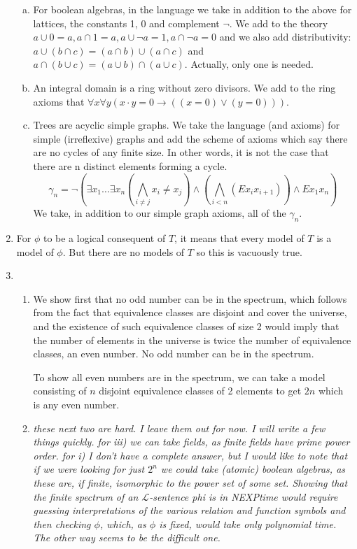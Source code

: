 \documentclass[10pt]{article}
\newcommand{\A}{\forall}
\newcommand{\E}{\exists}
\begin{document}
\begin{enumerate}[1.]
\begin{enumerate}[a)]
	\item For boolean algebras, in the language we take in addition to the above for lattices, the constants 1, 0 and complement $\neg$. We add to the theory $a \cup 0 = a, a \cap 1 = a, a \cup \neg a = 1, a \cap \neg a = 0$ and we also add distributivity: $a \cup (b \cap c) = (a \cap b) \cup (a \cap c)$ and $a \cap (b \cup c) = (a \cup b) \cap (a \cup c)$. Actually, only one is needed. 
	
	\item An integral domain is a ring without zero divisors. We add to the ring axioms that $\A x \A y (x \cdot y = 0 \to ((x = 0) \lor (y = 0)))$. 
	
	\item Trees are acyclic simple graphs. We take the language (and axioms) for simple (irreflexive) graphs and add the scheme of axioms which say there are no cycles of any finite size. In other words, it is not the case that there are n distinct elements forming a cycle. \[\gamma_n = \neg (\E x_1 \ldots \E x_n (\bigwedge_{i \neq j} x_i \neq x_j)  \land (\bigwedge_{i < n} (Ex_ix_{i+1})) \land Ex_1x_n)\] We take, in addition to our simple graph axioms, all of the $\gamma_n$. 
	
	\end{enumerate}

\item For $\phi$ to be a logical consequent of $T$, it means that every model of $T$ is a model of $\phi$. But there are no models of $T$ so this is vacuously true. 

\item 

	 \begin{enumerate} 
	 
	  \item We show first that no odd number can be in the spectrum, which follows from the fact that equivalence classes are disjoint and cover the universe, and the existence of such equivalence classes of size 2 would imply that the number of elements in the universe is twice the number of equivalence classes, an even number. No odd number can be in the spectrum. 
	
	To show all even numbers are in the spectrum, we can take a model consisting of $n$ disjoint equivalence classes of 2 elements to get $2n$ which is any even number. 
	
	\item \emph{these next two are hard. I leave them out for now. I will write a few things quickly. for iii) we can take fields, as finite fields have prime power order. for i) I don't have a complete answer, but I would like to note that if we were looking for just $2^n$ we could take (atomic) boolean algebras, as these are, if finite, isomorphic to the power set of some set. Showing that the finite spectrum of an $\mathcal{L}$-sentence phi is in NEXPtime would require guessing interpretations of the various relation and function symbols and then checking $\phi$, which, as $\phi$ is fixed, would take only polynomial time. The other way seems to be the difficult one.}
	

\end{enumerate}
\end{enumerate}
\end{document}
